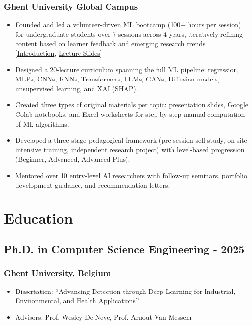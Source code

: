 \documentclass[11pt]{article}
\begin{document}
\subsubsection{Ghent University Global Campus}
\begin{itemize}
    \item[\checkmark] Founded and led a volunteer-driven ML bootcamp (100+ hours per session) for undergraduate students over 7 sessions across 4 years, iteratively refining content based on learner feedback and emerging research trends. [\href{https://github.com/powersimmani/AIVS}{Introduction}, \href{https://powersimmani.github.io/AIVS_Lecture_Slides/}{Lecture Slides}]
    \item[\checkmark] Designed a 20-lecture curriculum spanning the full ML pipeline: regression, MLPs, CNNs, RNNs, Transformers, LLMs, GANs, Diffusion models, unsupervised learning, and XAI (SHAP).
    \item[\checkmark] Created three types of original materials per topic: presentation slides, Google Colab notebooks, and Excel worksheets for step-by-step manual computation of ML algorithms.
    \item[\checkmark] Developed a three-stage pedagogical framework (pre-session self-study, on-site intensive training, independent research project) with level-based progression (Beginner, Advanced, Advanced Plus).
    \item[\checkmark] Mentored over 10 entry-level AI researchers with follow-up seminars, portfolio development guidance, and recommendation letters.
\end{itemize}

\section{Education}
\subsection{Ph.D. in Computer Science Engineering\hfill {} - 2025}
\subsubsection{Ghent University, Belgium}
\begin{itemize}
    \item[\checkmark] Dissertation: ``Advancing Detection through Deep Learning for Industrial, Environmental, and Health Applications''
    \item[\checkmark] Advisors: Prof. Wesley De Neve, Prof. Arnout Van Messem
\end{itemize}
\end{document}

